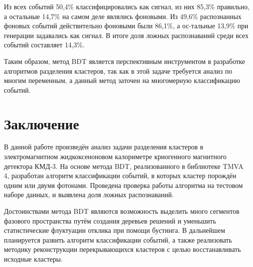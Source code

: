 \documentclass[14pt]{extarticle}
\begin{document}
Из всех событий 50,4\% классифицировались как сигнал, из них 85,3\% правильно, а остальные 14,7\% на самом деле являлись фоновыми. Из 49,6\% распознанных фоновых событий действительно фоновыми были 86,1\%, а ос-тальные 13,9\% при генерации задавались как сигнал. В итоге доля ложных распознаваний среди всех событий составляет 14,3\%.

Таким образом, метод BDT является перспективным инструментом в разработке алгоритмов разделения кластеров, так как в этой задаче требуется анализ по многим переменным, а данный метод заточен на многомерную классификацию событий.
\section{Заключение}
В данной работе произведён анализ задачи разделения кластеров в электромагнитном жидкоксеноновом калориметре криогенного магнитного детектора КМД-3. На основе метода BDT, реализованного в библиотеке TMVA 4, разработан алгоритм классификации событий, в которых кластер порождён одним или двумя фотонами. Проведена проверка работы алгоритма на тестовом наборе данных, и выявлена доля ложных распознаваний.

Достоинствами метода BDT являются возможность выделить много сегментов фазового пространства путём создания деревьев решений и уменьшить статистические флуктуации отклика при помощи бустинга. В дальнейшем планируется развить алгоритм классификации событий, а также реализовать методику реконструкции перекрывающихся кластеров с целью восстанавливать исходные кластеры.



\end{document}
